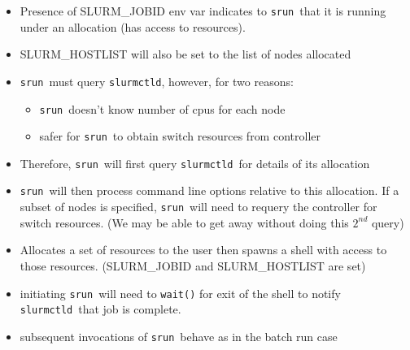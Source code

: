 \documentclass[article,letter,landscape]{seminar}
\newcommand{\slurmctld}{{\tt slurmctld}}
\newcommand{\srun}{{\tt srun}}
\begin{document}
\begin{slide}
  \begin{center}
  \begin{itemize}
    \item Presence of SLURM\_JOBID env var indicates to \srun\ that it
          is running under an allocation (has access to resources).
    \item SLURM\_HOSTLIST will also be set to the list of nodes allocated
    \item \srun\ must query \slurmctld , however, for two reasons:
    \begin{itemize}
      \item \srun\ doesn't know number of cpus for each node
      \item safer for \srun\ to obtain switch resources from controller
    \end{itemize}
    \item Therefore, \srun\ will first query \slurmctld\ for details of
          its allocation
    \item \srun\ will then process command line options relative to this
          allocation. If a subset of nodes is specified, \srun\ will need
	  to requery the controller for switch resources. (We may be
	  able to get away without doing this $2^{nd}$ query)
  \end{itemize}
  \end{center}
\end{slide}

\begin{slide}
  \begin{center}
  \begin{itemize}
  \item Allocates a set of resources to the
        user then spawns a shell with access to those resources.
	(SLURM\_JOBID and SLURM\_HOSTLIST are set)
  \item initiating \srun\ will need to {\tt wait()} for exit
        of the shell to notify \slurmctld\ that job is complete.
  \item subsequent invocations of \srun\ behave as in the batch run
        case
  \end{itemize}
  \end{center}
\end{slide}
\end{document}
